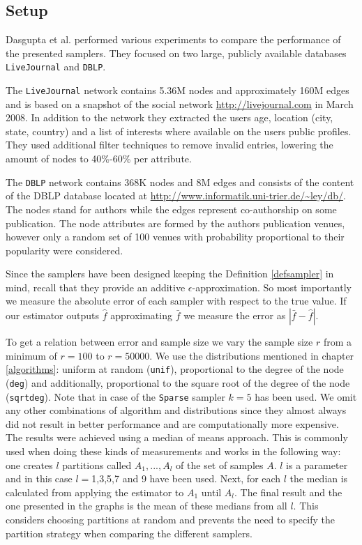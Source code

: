 \subsection{Setup}
Dasgupta et al. \cite{dasgupta2012social} performed various experiments to compare the performance of the presented samplers.
They focused on two large, publicly available databases \texttt{LiveJournal} and \texttt{DBLP}.

The \texttt{LiveJournal} network contains 5.36M nodes and approximately 160M edges and is based on a snapshot of the social network \url{http://livejournal.com} in March 2008. In addition to the network they extracted the users age, location (city, state, country) and a list of interests where available on the users public profiles. They used additional filter techniques to remove invalid entries, lowering the amount of nodes to 40\%-60\% per attribute.

The \texttt{DBLP} network contains 368K nodes and 8M edges and consists of the content of the DBLP database located at \url{http://www.informatik.uni-trier.de/~ley/db/}. The nodes stand for authors while the edges represent co-authorship on some publication. The node attributes are formed by the authors publication venues, however only a random set of 100 venues with probability proportional to their popularity were considered. 

Since the samplers have been designed keeping the Definition \ref{defsampler} in mind, recall that they provide an additive $\epsilon$-approximation. So most importantly we measure the absolute error of each sampler with respect to the true value. If our estimator outputs $\hat{f}$ approximating $\bar{f}$ we measure the error as $|\bar{f}-\hat{f}|$.

To get a relation between error and sample size we vary the sample size $r$ from a minimum of $r = 100$ to $r = 50000$. We use the distributions mentioned in chapter \ref{algorithms}: uniform at random (\texttt{unif}), proportional to the degree of the node (\texttt{deg}) and additionally, proportional to the square root of the degree of the node (\texttt{sqrtdeg}). Note that in case of the \texttt{Sparse} sampler $k = 5$ has been used.
We omit any other combinations of algorithm and distributions since they almost always did not result in better performance and are computationally more expensive. 
The results were achieved using a median of means approach. This is commonly used when doing these kinds of measurements and works in the following way: one creates $l$ partitions called $A_1,...,A_l$ of the set of samples $A$. $l$ is a parameter and in this case $l = $1,3,5,7 and 9 have been used. Next, for each $l$ the median is calculated from applying the estimator to $A_1$ until $A_l$. The final result and the one presented in the graphs is the mean of these medians from all $l$.
This considers choosing partitions at random and prevents the need to specify the partition strategy when comparing the different samplers.

